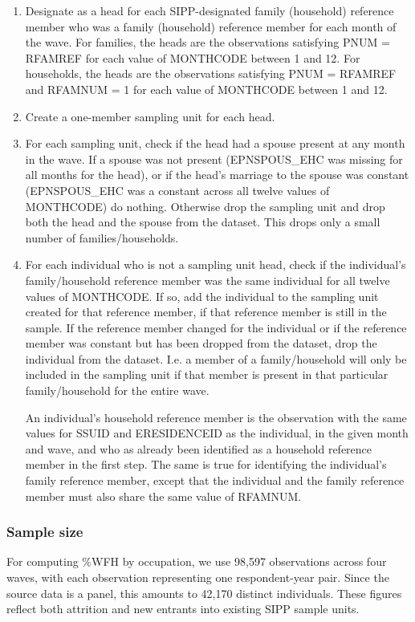 \documentclass{article}
\begin{document}
\begin{enumerate}
\item Designate as a head for each SIPP-designated family (household) reference member who was a family (household) reference member for each month of the wave. For families, the heads are the observations satisfying PNUM = RFAMREF for each value of MONTHCODE between 1 and 12. For households, the heads are the observations satisfying PNUM = RFAMREF and RFAMNUM = 1 for each value of MONTHCODE between 1 and 12.
\item Create a one-member sampling unit for each head.
\item For each sampling unit, check if the head had a spouse present at any month in the wave. If a spouse was not present (EPNSPOUS\_EHC was missing for all months for the head), or if the head's marriage to the spouse was constant (EPNSPOUS\_EHC was a constant across all twelve values of MONTHCODE) do nothing. Otherwise drop the sampling unit and drop both the head and the spouse from the dataset. This drops only a small number of families/households.
\item For each individual who is not a sampling unit head, check if the individual's family/household reference member was the same individual for all twelve values of MONTHCODE. If so, add the individual to the sampling unit created for that reference member, if that reference member is still in the sample. If the reference member changed for the individual or if the reference member was constant but has been dropped from the dataset, drop the individual from the dataset. I.e. a member of a family/household will only be included in the sampling unit if that member is present in that particular family/household for the entire wave.

An individual's household reference member is the observation with the same values for SSUID and ERESIDENCEID as the individual, in the given month and wave, and who as already been identified as a household reference member in the first step. The same is true for identifying the individual's family reference member, except that the individual and the family reference member must also share the same value of RFAMNUM.
\end{enumerate}

\subsubsection{Sample size}
For computing \%WFH by occupation, we use 98,597 observations across four waves, with each observation representing one respondent-year pair. Since the source data is a panel, this amounts to 42,170 distinct individuals. These figures reflect both attrition and new entrants into existing SIPP sample units. 
\end{document}
